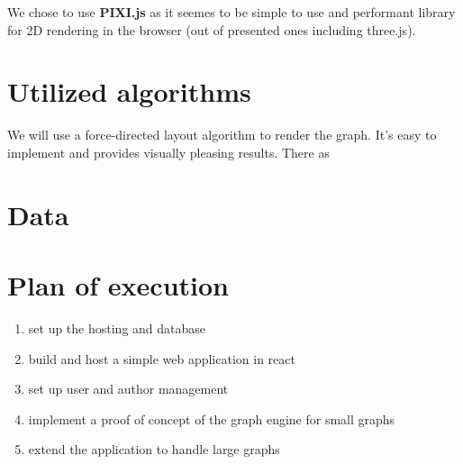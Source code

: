 We chose to use \textbf{PIXI.js} as it seemes to be simple to use and performant library for 2D rendering in the browser
(out of presented ones including three.js).


\section{Utilized algorithms}

We will use a force-directed layout algorithm to render the graph. It's easy to implement and provides visually pleasing results.
There as 


\section{Data}

\section{Plan of execution}
\begin{enumerate}
    \item set up the hosting and database
    \item build and host a simple web application in react
    \item set up user and author management
    \item implement a proof of concept of the graph engine for small graphs
    \item extend the application to handle large graphs
\end{enumerate}
